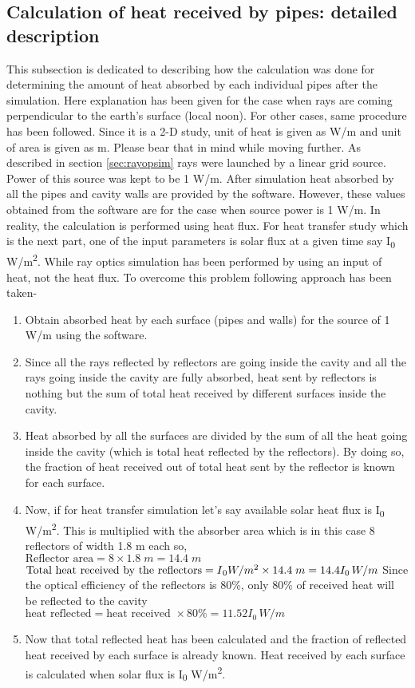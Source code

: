 \subsection{Calculation of heat received by pipes: detailed description}\label{subsec:calcHeatRecPipesDetailedDescrip}
This subsection is dedicated to describing how the calculation was done for determining the amount of heat absorbed by each individual pipes after the simulation. Here explanation has been given for the case when rays are coming perpendicular to the earth's surface (local noon). For other cases, same procedure has been followed. Since it is a 2-D study, unit of heat is given as W/m and unit of area is given as m. Please bear that in mind while moving further. As described in section \ref{sec:rayopsim} rays were launched by a linear grid source. Power of this source was kept to be 1 W/m. After simulation heat absorbed by all the pipes and cavity walls are provided by the software. However, these values obtained from the software are for the case when source power is 1 W/m. In reality, the calculation is performed using heat flux. For heat transfer study which is the next part, one of the input parameters is solar flux at a given time say I\textsubscript{0} W/m\textsuperscript{2}. While ray optics simulation has been performed by using an input of heat, not the heat flux. To overcome this problem following approach has been taken-
\begin{enumerate}
\item Obtain absorbed heat by each surface (pipes and walls) for the source of 1 W/m using the software.
\item Since all the rays reflected by reflectors are going inside the cavity and all the rays going inside the cavity are fully absorbed, heat sent by reflectors is nothing but the sum of total heat received by different surfaces inside the cavity.
\item Heat absorbed by all the surfaces are divided by the sum of all the heat going inside the cavity (which is total heat reflected by the reflectors). By doing so, the fraction of heat received out of total heat sent by the reflector is known for each surface.
\item Now, if for heat transfer simulation let's say available solar heat flux is I\textsubscript{0} W/m\textsuperscript{2}. This is multiplied with the absorber area which is in this case 8 reflectors of width 1.8 m each so, 
\\
$ \text{Reflector area} = 8 \times 1.8\; m = 14.4\; m$ \\
$ \text{Total heat received by the reflectors} = I\textsubscript{0} W/m\textsuperscript{2} \times 14.4\; m = 14.4I_{0}\,W/m$  
Since the optical efficiency of the reflectors is 80\%, only 80\% of received heat will be reflected to the cavity \\
$\text{heat reflected} = \text{heat received } \times 80 \% = 11.52I_{0}\,W/m$ 
\item Now that total reflected heat has been calculated and the fraction of reflected heat received by each surface is already known. Heat received by each surface is calculated when solar flux is I\textsubscript{0} W/m\textsuperscript{2}.
\end{enumerate}
